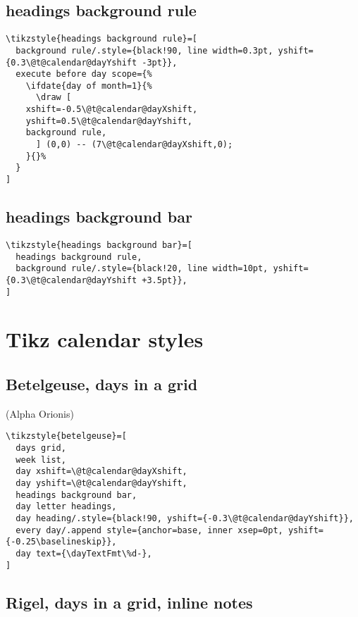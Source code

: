\documentclass[11pt,oneside]{memoir-article}
\begin{document}
\subsection{headings background rule}
\label{sec:org6a23a5b}

\begin{verbatim}
\tikzstyle{headings background rule}=[
  background rule/.style={black!90, line width=0.3pt, yshift={0.3\@t@calendar@dayYshift -3pt}},
  execute before day scope={%
    \ifdate{day of month=1}{%
      \draw [
	xshift=-0.5\@t@calendar@dayXshift,
	yshift=0.5\@t@calendar@dayYshift,
	background rule,
      ] (0,0) -- (7\@t@calendar@dayXshift,0);
    }{}%
  }
]
\end{verbatim}

\subsection{headings background bar}
\label{sec:org9d53f6b}

\begin{verbatim}
\tikzstyle{headings background bar}=[
  headings background rule,
  background rule/.style={black!20, line width=10pt, yshift={0.3\@t@calendar@dayYshift +3.5pt}},
]
\end{verbatim}

\section{Tikz calendar styles}
\label{sec:org7a2e0af}
\subsection{Betelgeuse, days in a grid}
\label{sec:orgc21ffc7}

(Alpha Orionis)

\begin{verbatim}
\tikzstyle{betelgeuse}=[
  days grid,
  week list,
  day xshift=\@t@calendar@dayXshift,
  day yshift=\@t@calendar@dayYshift,
  headings background bar,
  day letter headings,
  day heading/.style={black!90, yshift={-0.3\@t@calendar@dayYshift}},
  every day/.append style={anchor=base, inner xsep=0pt, yshift={-0.25\baselineskip}},
  day text={\dayTextFmt\%d-},
]
\end{verbatim}

\subsection{Rigel, days in a grid, inline notes}
\label{sec:orgb541066}
\end{document}

